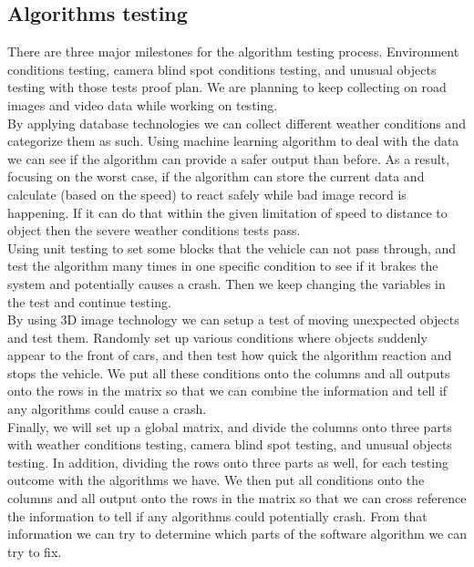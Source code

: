 \documentclass[10pt,draftclsnofoot,onecolumn,journal,compsoc]{IEEEtran}
\begin{document}
\subsection{Algorithms testing}
There are three major milestones for the algorithm testing process. Environment conditions testing, camera blind spot conditions testing, and unusual objects testing with those tests proof plan. We are planning to keep collecting on road images and video data while working on testing.\\
By applying database technologies we can collect different weather conditions and categorize them as such. Using machine learning algorithm to deal with the data we can see if the algorithm can provide a safer output than before. As a result, focusing on the worst case, if the algorithm can store the current data and calculate (based on the speed) to react safely while bad image record is happening. If it can do that within the given limitation of speed to distance to object then the severe weather conditions tests pass.\\
Using unit testing to set some blocks that the vehicle can not pass through, and test the algorithm many times in one specific condition to see if it brakes the system and potentially causes a crash. Then we keep changing the variables in the test and continue testing.\\
By using 3D image technology we can setup a test of moving unexpected objects and test them. Randomly set up various conditions where objects suddenly appear to the front of cars, and then test how quick the algorithm reaction and stops the vehicle. We put all these conditions onto the columns and all outputs onto the rows in the matrix so that we can combine the information and tell if any algorithms could cause a crash.\\
Finally, we will set up a global matrix, and divide the columns onto three parts with weather conditions testing, camera blind spot testing, and unusual objects testing. In addition, dividing the rows onto three parts as well, for each testing outcome with the algorithms we have. We then put all conditions onto the columns and all output onto the rows in the matrix so that we can cross reference the information to tell if any algorithms could potentially crash. From that information we can try to determine which parts of the software algorithm we can try to fix.
\end{document}
